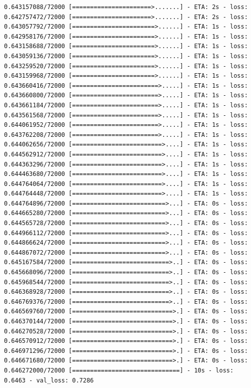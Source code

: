 \documentclass[12pt,fleqn]{article}\usepackage{../../common}
\begin{document}
\begin{verbatim}
0.643157088/72000 [======================>.......] - ETA: 2s - loss: 0.642757472/72000 [======================>.......] - ETA: 2s - loss: 0.643057792/72000 [=======================>......] - ETA: 1s - loss: 0.642958176/72000 [=======================>......] - ETA: 1s - loss: 0.643158688/72000 [=======================>......] - ETA: 1s - loss: 0.643059136/72000 [=======================>......] - ETA: 1s - loss: 0.643259520/72000 [=======================>......] - ETA: 1s - loss: 0.643159968/72000 [=======================>......] - ETA: 1s - loss: 0.643660416/72000 [========================>.....] - ETA: 1s - loss: 0.643660800/72000 [========================>.....] - ETA: 1s - loss: 0.643661184/72000 [========================>.....] - ETA: 1s - loss: 0.643561568/72000 [========================>.....] - ETA: 1s - loss: 0.644061952/72000 [========================>.....] - ETA: 1s - loss: 0.643762208/72000 [========================>.....] - ETA: 1s - loss: 0.644062656/72000 [=========================>....] - ETA: 1s - loss: 0.644562912/72000 [=========================>....] - ETA: 1s - loss: 0.644363296/72000 [=========================>....] - ETA: 1s - loss: 0.644463680/72000 [=========================>....] - ETA: 1s - loss: 0.644764064/72000 [=========================>....] - ETA: 1s - loss: 0.644764448/72000 [=========================>....] - ETA: 1s - loss: 0.644764896/72000 [==========================>...] - ETA: 0s - loss: 0.644665280/72000 [==========================>...] - ETA: 0s - loss: 0.644565728/72000 [==========================>...] - ETA: 0s - loss: 0.644966112/72000 [==========================>...] - ETA: 0s - loss: 0.644866624/72000 [==========================>...] - ETA: 0s - loss: 0.644867072/72000 [==========================>...] - ETA: 0s - loss: 0.645167584/72000 [===========================>..] - ETA: 0s - loss: 0.645668096/72000 [===========================>..] - ETA: 0s - loss: 0.645968544/72000 [===========================>..] - ETA: 0s - loss: 0.646368928/72000 [===========================>..] - ETA: 0s - loss: 0.646769376/72000 [===========================>..] - ETA: 0s - loss: 0.646569760/72000 [============================>.] - ETA: 0s - loss: 0.646370144/72000 [============================>.] - ETA: 0s - loss: 0.646270528/72000 [============================>.] - ETA: 0s - loss: 0.646570912/72000 [============================>.] - ETA: 0s - loss: 0.646971296/72000 [============================>.] - ETA: 0s - loss: 0.646671680/72000 [============================>.] - ETA: 0s - loss: 0.646272000/72000 [==============================] - 10s - loss: 0.6463 - val_loss: 0.7286

\end{verbatim}
\end{document}
